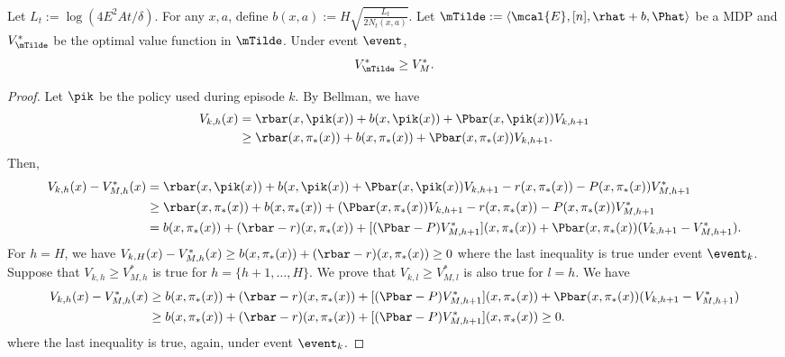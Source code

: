             \begin{lem}
            \label{lem:bonus}
            Let $L_t:=\log(4E^2At/\delta)$. For any $x,a$, define $b(x,a):=H\sqrt{\frac{L_t}{2N_t(x,a)}}$.
            Let $\mTilde:=\langle\mcal{E}, [n], \rhat+b, \Phat\rangle$ be a MDP and $V_{\mTilde}^{*}$ be the optimal value function in $\mTilde$.
            Under event $\event$, $$V_{\mTilde}^{*} \ge V_M^*.$$
            \end{lem}
            \begin{proof}
            Let $\pik$ be the policy used during episode $k$. By Bellman, we have
            \begin{align*}
            V_{k,h}(x)
            &= \rbar(x,\pik(x)) +b(x,\pik(x)) +\Pbar(x,\pik(x)) V_{k,h+1} \\
            &\ge \rbar(x,\pi_*(x)) +b(x,\pi_*(x)) +\Pbar(x,\pi_*(x)) V_{k,h+1}.
            \end{align*}
            Then,
            \begin{align*}
            V_{k,h}(x) -V_{M,h}^{*}(x)
            &= \rbar(x,\pik(x)) +b(x,\pik(x)) +\Pbar(x,\pik(x)) V_{k,h+1} 
            -r(x,\pi_*(x)) -P(x,\pi_*(x))V_{M,h+1}^{*} \\
            &\ge \rbar(x,\pi_*(x)) +b(x,\pi_*(x)) +(\Pbar(x,\pi_*(x)) V_{k,h+1}
            -r(x,\pi_*(x)) -P(x,\pi_*(x))V_{M,h+1}^{*} \\
            &= b(x,\pi_*(x)) +(\rbar-r)(x,\pi_*(x)) +[(\Pbar-P)V_{M,h+1}^{*}](x,\pi_*(x)) +\Pbar(x,\pi_*(x))(V_{k,h+1} -V_{M,h+1}^{*}).
            \end{align*}
            For $h=H$, we have $V_{k,H}(x) -V_{M,h}^*(x) \ge b(x,\pi_*(x)) +(\rbar-r)(x,\pi_*(x)) \ge0$ where the last inequality is true under event $\event_k$.
            Suppose that $V_{k,h}\ge V_{M,h}^*$ is true for $h=\{h+1,\dots,H\}$.
            We prove that $V_{k,l}\ge V_{M,l}^*$ is also true for $l=h$.
            We have
            \begin{align*}
            V_{k,h}(x) -V_{M,h}^{*}(x)
            &\ge b(x,\pi_*(x)) +(\rbar-r)(x,\pi_*(x)) +[(\Pbar-P)V_{M,h+1}^{*}](x,\pi_*(x)) +\Pbar(x,\pi_*(x))(V_{k,h+1} -V_{M,h+1}^{*}) \\
            &\ge b(x,\pi_*(x)) +(\rbar-r)(x,\pi_*(x)) +[(\Pbar-P)V_{M,h+1}^{*}](x,\pi_*(x)) \ge0.
            \end{align*}
            where the last inequality is true, again, under event $\event_k$.
            \end{proof}
        
